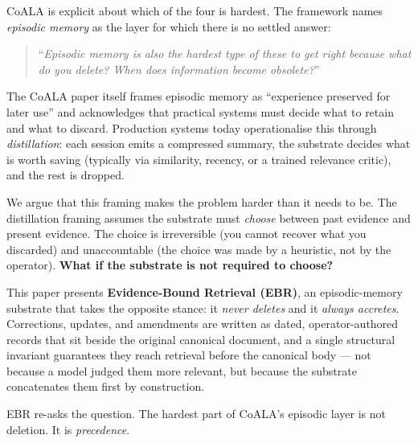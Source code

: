 \documentclass[11pt,a4paper]{article}
\begin{document}
CoALA is explicit about which of the four is hardest. The framework names
\emph{episodic memory} as the layer for which there is no settled answer:
\begin{quote}
``\emph{Episodic memory is also the hardest type of these to get right because what do
you delete? When does information become obsolete?}''~\cite{ibm2026memory}
\end{quote}
The CoALA paper itself frames episodic memory as ``experience preserved for later use''
and acknowledges that practical systems must decide what to retain and what to discard.
Production systems today operationalise this through \emph{distillation}: each session
emits a compressed summary, the substrate decides what is worth saving (typically via
similarity, recency, or a trained relevance critic), and the rest is dropped.

We argue that this framing makes the problem harder than it needs to be. The
distillation framing assumes the substrate must \emph{choose} between past evidence and
present evidence. The choice is irreversible (you cannot recover what you discarded) and
unaccountable (the choice was made by a heuristic, not by the operator). \textbf{What if
the substrate is not required to choose?}

This paper presents \textbf{Evidence-Bound Retrieval (EBR)}, an episodic-memory substrate
that takes the opposite stance: it \emph{never deletes} and it \emph{always accretes}.
Corrections, updates, and amendments are written as dated, operator-authored records
that sit beside the original canonical document, and a single structural invariant
guarantees they reach retrieval before the canonical body --- not because a model judged
them more relevant, but because the substrate concatenates them first by construction.

EBR re-asks the question. The hardest part of CoALA's episodic layer is not deletion. It
is \emph{precedence}.
\end{document}
